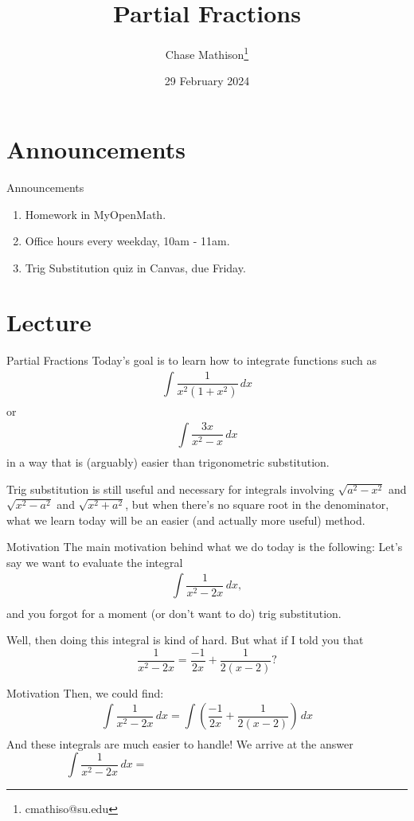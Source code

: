 \documentclass[presentation]{beamer}
\institute[SU]{Shenandoah University}
\author{Chase Mathison\thanks{cmathiso@su.edu}}
\date{29 February 2024}
\title{Partial Fractions}
\begin{document}
\maketitle

\section{Announcements}
\label{sec:orgb93f4ca}
\begin{frame}[label={sec:org673b113}]{Announcements}
\begin{enumerate}
\item Homework in MyOpenMath.
\item Office hours every weekday, 10am - 11am.
\item Trig Substitution quiz in Canvas, due Friday.
\end{enumerate}
\end{frame}

\section{Lecture}
\label{sec:orgaae9af0}
\begin{frame}[label={sec:org7a28c04}]{Partial Fractions}
Today's goal is to learn how to integrate functions such as
\[
\int\limits_{}^{} \frac{1}{x^2 \left( 1+x^2 \right)}\,dx \]
or
\[
\int\limits_{}^{} \frac{3x}{x^2-x}\,dx \]
in a way that is (arguably) easier than trigonometric substitution.

Trig substitution is still useful and necessary for integrals
involving \(\sqrt{a^2-x^2}\) and \(\sqrt{x^2-a^2}\) and
\(\sqrt{x^2+a^2}\), but when there's no square root in the
denominator, what we learn today will be an easier (and actually more
useful) method.
\end{frame}

\begin{frame}[label={sec:org5fb5a8c}]{Motivation}
The main motivation behind what we do today is the following:
Let's say we want to evaluate the integral
\[
\int\limits_{}^{} \frac{1}{x^2-2x}\,dx, \]
and you forgot for a moment (or don't want to do) trig substitution.

Well, then doing this integral is kind of hard.  But what if I told
you that
\[
\frac{1}{x^2-2x} = \frac{-1}{2x} + \frac{1}{2 \left( x-2 \right)}? \]
\end{frame}

\begin{frame}[label={sec:org999ce09}]{Motivation}
Then, we could find:
\[
\int\limits_{}^{} \frac{1}{x^2-2x}\,dx = \int \left( \frac{-1}{2x}
+\frac{1}{2 \left( x-2 \right)}\right)\,dx \]
And these integrals are much easier to handle!  We arrive at the
answer
\[
\int \frac{1}{x^2-2x}\,dx = \hspace{3in} \]
\end{frame}
\end{document}
